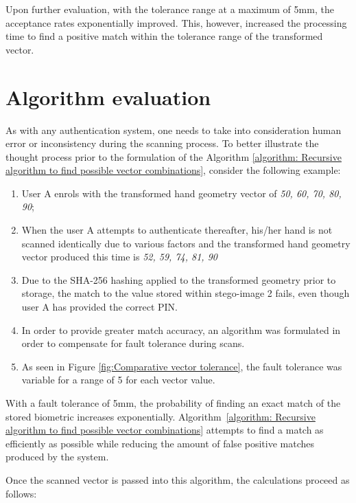 Upon further evaluation, with the tolerance range at a maximum of 5mm, the acceptance rates exponentially improved. This, however, increased the processing time to find a positive match within the tolerance range of the transformed vector. 

\section{Algorithm evaluation}

As with any authentication system, one needs to take into consideration human error or inconsistency during the scanning process. To better illustrate the thought process prior to the formulation of the Algorithm \ref{algorithm: Recursive algorithm to find possible vector combinations}, consider the following example:

\begin{enumerate}[label=\roman*.]
    \item User A enrols with the transformed hand geometry vector of \textit{50, 60, 70, 80, 90};
    \item When the user A attempts to authenticate thereafter, his/her hand is not scanned identically due to various factors and the transformed hand geometry vector produced this time is \textit{52, 59, 74, 81, 90}
    \item Due to the SHA-256 hashing applied to the transformed geometry prior to storage, the match to the value stored within stego-image 2 fails, even though user A has provided the correct PIN.
    \item In order to provide greater match accuracy, an algorithm was formulated in order to compensate for fault tolerance during scans.
    \item As seen in Figure \ref{fig:Comparative vector tolerance}, the fault tolerance was variable for a range of 5 for each vector value.
\end{enumerate}

With a fault tolerance of 5mm, the probability of finding an exact match of the stored biometric increases exponentially. Algorithm~\ref{algorithm: Recursive algorithm to find possible vector combinations} attempts to find a match as efficiently as possible while reducing the amount of false positive matches produced by the system.

Once the scanned vector is passed into this algorithm, the calculations proceed as follows:


